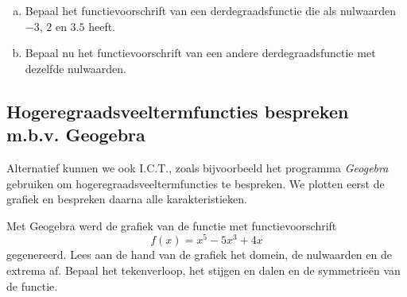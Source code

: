 \documentclass[12pt,twoside,a4paper]{article}
\begin{document}
\begin{oefening}
\begin{enumerate}[(a)]
  \item Bepaal het functievoorschrift van een derdegraadsfunctie die als nulwaarden $-3$, $2$ en $3.5$ heeft.
  \item Bepaal nu het functievoorschrift van een andere derdegraadsfunctie met dezelfde nulwaarden.
\end{enumerate}
\end{oefening}

\needspace{4cm}
\subsection{Hogeregraadsveeltermfuncties bespreken m.b.v. Geogebra}
Alternatief kunnen we ook I.C.T., zoals bijvoorbeeld het programma {\em Geogebra} gebruiken om hogeregraadsveeltermfuncties te bespreken. We plotten eerst de grafiek en bespreken daarna alle karakteristieken.

\begin{oefening}
  Met Geogebra werd de grafiek van de functie met functievoorschrift
  $$f(x)=x^5-5x^3+4x$$
  gegenereerd. Lees aan de hand van de grafiek het domein, de nulwaarden en de extrema af. Bepaal het tekenverloop, het stijgen en dalen en de symmetrieën van de functie.\\
  \begin{center}
  \end{center}
\end{oefening}
\end{document}
